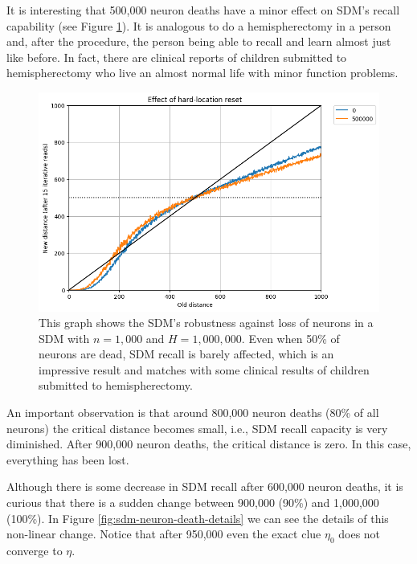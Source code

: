 It is interesting that 500,000 neuron deaths have a minor effect on SDM's recall capability (see Figure \ref{fig:sdm-neuron-death-500k}). It is analogous to do a hemispherectomy in a person and, after the procedure, the person being able to recall and learn almost just like before. In fact, there are clinical reports of children submitted to hemispherectomy who live an almost normal life with minor function problems.

\begin{figure}[!p]
\centering\includegraphics[width=\textwidth]{./images02/new-images/sdm-neuron-death-500k.png}
\caption{This graph shows the SDM's robustness against loss of neurons in a SDM with $n=1,000$ and $H=1,000,000$. Even when 50\% of neurons are dead, SDM recall is barely affected, which is an impressive result and matches with some clinical results of children submitted to hemispherectomy.
\label{fig:sdm-neuron-death-500k}}
\end{figure}

An important observation is that around 800,000 neuron deaths (80\% of all neurons) the critical distance becomes small, i.e., SDM recall capacity is very diminished. After 900,000 neuron deaths, the critical distance is zero. In this case, everything has been lost.

Although there is some decrease in SDM recall after 600,000 neuron deaths, it is curious that there is a sudden change between 900,000 (90\%) and 1,000,000 (100\%). In Figure \ref{fig:sdm-neuron-death-details} we can see the details of this non-linear change. Notice that after 950,000 even the exact clue $\eta_0$ does not converge to $\eta$.

